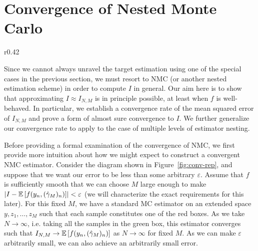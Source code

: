 
\section{Convergence of Nested Monte Carlo}
\label{sec:convergence}

\begin{wrapfigure}{r}{0.42\textwidth}
	\vspace{-12pt}
	\centering 
	\resizebox{.4\textwidth}{!}{
		
	}
	\caption{Convergence representation \label{fig:conv-rep}}
	\vspace{-10pt}
\end{wrapfigure}

Since we cannot always unravel the target estimation using one of the special cases in the previous section, we must resort to NMC (or another nested estimation scheme) in order to compute $I$ in general. 
Our aim here is to show that
approximating $I \approx I_{N,M}$ is in principle possible, at least when $f$ is
well-behaved. In particular, we establish a convergence rate of 
the mean squared error of $I_{N,M}$ and prove a form of almost sure convergence to
$I$.  We further generalize our convergence rate to apply to the case of multiple
levels of estimator nesting.


Before providing a formal examination of the convergence of NMC, we first provide more
intuition about how we might expect to construct a convergent NMC estimator.  Consider the
diagram shown in Figure~\ref{fig:conv-rep}, and suppose that we want our error to be
less than some arbitrary $\varepsilon$.  Assume that $f$ is sufficiently smooth 
that we can choose $M$ large enough to make
$\left|I-\mathbb{E}\left[f(y_n,(\hat{\gamma}_M)_n)\right]\right| < \varepsilon$
(we will characterize the exact requirements for this later).  For this fixed
$M$, we have a standard MC estimator on an extended space $y,z_1,\dots,z_M$ such that each
sample constitutes one of the red boxes.  As we take $N\rightarrow \infty$, i.e. taking
all the samples in the green box, this estimator converges such that $I_{N,M}
\to \mathbb{E}\left[f(y_n,(\hat{\gamma}_M)_n)\right]$ as $N \to \infty$ for fixed $M$.  As we can
make $\varepsilon$ arbitrarily small, we can also achieve an arbitrarily small error.

